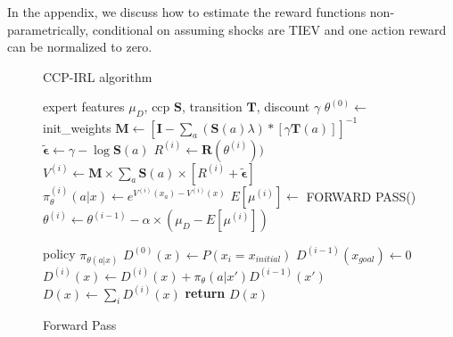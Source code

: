 \documentclass{article}
\begin{document}
In the appendix, we discuss how to estimate the reward functions non-parametrically, conditional on assuming shocks are TIEV and one action reward can be normalized to zero. 

\begin{figure}[ht]
\begin{minipage}[t]{0.45\textwidth}
  \begin{algorithm}[H]
    \caption{CCP-IRL algorithm} \label{algo:ccp_irl_algorithm}
    \begin{algorithmic}[1]
         expert features $\mu_D$, ccp $\mathbf{S}$, transition $\mathbf{T}$, discount $\gamma$
        \STATE $\theta^{(0)} \gets$ init\_weights
        \STATE $\mathbf{M} \gets \left[\mathbf{I}-\sum_{a}(\mathbf{S}(a) \lambda) *\left[ \gamma \mathbf{T}(a)  \right]\right]^{-1}$ 
        \STATE $\tilde{\bm{\epsilon}} \gets \gamma - \log \mathbf{S}(a)$
            \STATE $R^{(i)} \gets \mathbf{R}(\theta^{(i)}))$
            \STATE $V^{(i)} \gets \mathbf{M} \times \sum_{a}{\mathbf{S}(a) \times \left[ R^{(i)} +\tilde{\bm{\epsilon}}\right]}$
            \STATE $\pi_{\theta}^{(i)}(a|x) \gets e^{V^{(i)}(x_a) - V^{(i)}(x)}$
            \STATE $E[\mu^{(i)}] \gets $ FORWARD PASS()
            \STATE $\theta^{(i)} \gets \theta^{(i-1)} - \alpha \times (\mu_D - E[\mu^{(i)}])$
        \ENDFOR
    \end{algorithmic}
  \end{algorithm}
\end{minipage}%
\qquad
\begin{minipage}[t]{0.45\textwidth}
  \begin{algorithm}[H]
    \caption{Forward Pass} \label{algo:forward_pass_algorithm}
    \begin{algorithmic}[1]
         policy $\pi_{\theta(a|x)}$
        \STATE $D^{(0)}(x) \gets P(x_i = x_{initial})$
            \STATE $D^{(i-1)}(x_{goal}) \gets 0$
            \STATE $D^{(i)}(x) \gets D^{(i)}(x) + \pi_{\theta}(a|x') D^{(i-1)}(x')$
        \ENDFOR
        \STATE $D(x) \gets \sum_{i}D^{(i)}(x)$ 
        \STATE \textbf{return} $D(x)$
    \end{algorithmic}
  \end{algorithm}
\end{minipage}
\end{figure}
\end{document}

